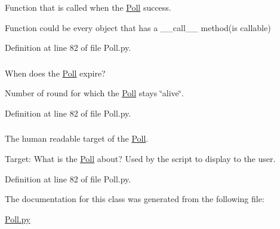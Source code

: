 \-Function that is called when the \hyperlink{class_poll_1_1_poll}{\-Poll} success. 

\-Function could be every object that has a \-\_\-\-\_\-call\-\_\-\-\_\- method(is callable) 

\-Definition at line 82 of file \-Poll.\-py.

\hypertarget{class_poll_1_1_poll_a6784d251ce1b468a297aec9d1a8deb30}{
\subsubsection[{alive\-Rounds}]{}}
\label{class_poll_1_1_poll_a6784d251ce1b468a297aec9d1a8deb30}


\-When does the \hyperlink{class_poll_1_1_poll}{\-Poll} expire? 

\-Number of round for which the \hyperlink{class_poll_1_1_poll}{\-Poll} stays \char`\"{}alive\char`\"{}. 

\-Definition at line 82 of file \-Poll.\-py.

\hypertarget{class_poll_1_1_poll_a4ba15cd9aa2b52ac8226eb969679632f}{
\subsubsection[{target}]{}}
\label{class_poll_1_1_poll_a4ba15cd9aa2b52ac8226eb969679632f}


\-The human readable target of the \hyperlink{class_poll_1_1_poll}{\-Poll}. 

\-Target\-: \-What is the \hyperlink{class_poll_1_1_poll}{\-Poll} about? \-Used by the script to display to the user. 

\-Definition at line 82 of file \-Poll.\-py.



\-The documentation for this class was generated from the following file\-:\begin{DoxyCompactItemize}
\item 
\hyperlink{_poll_8py}{\-Poll.\-py}\end{DoxyCompactItemize}
